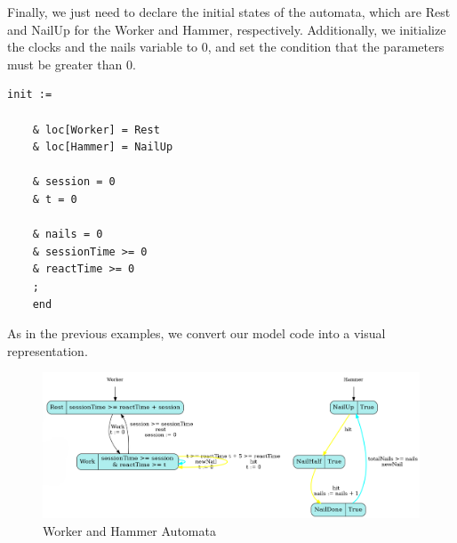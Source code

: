 \begin{table}[h!]
\centering
{}
\caption[Hammer Transistion Table]{Hammer Transistion Table}
\label{tab:wh_t2}
\end{table}

Finally, we just need to declare the initial states of the automata, which are Rest and NailUp for the Worker and Hammer, respectively. Additionally, we initialize the clocks and the nails variable to 0, and set the condition that the parameters must be greater than 0.

\begin{lstlisting}[language=UPPAAL]
    init := 
  
    & loc[Worker] = Rest
    & loc[Hammer] = NailUp
    
    & session = 0
    & t = 0
    
    & nails = 0
    & sessionTime >= 0
    & reactTime >= 0
    ;
    end
\end{lstlisting}


As in the previous examples, we convert our model code into a visual representation.

\begin{figure} [H]
    \centering
    \includegraphics[width=1\linewidth]{images/WH-PTA.png}
    \caption[Worker and Hammer Automata]{Worker and Hammer Automata}
    \label{fig:cof_output}
\end{figure}




